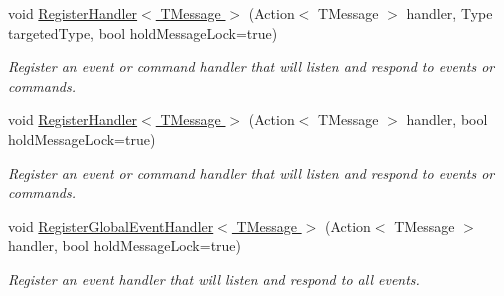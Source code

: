 \begin{DoxyCompactItemize}
void \hyperlink{classCqrs_1_1Akka_1_1Events_1_1AkkaEventBus_a59ec3e497e511b73b5239eee80691443_a59ec3e497e511b73b5239eee80691443}{Register\+Handler$<$ T\+Message $>$} (Action$<$ T\+Message $>$ handler, Type targeted\+Type, bool hold\+Message\+Lock=true)
\begin{DoxyCompactList}\small\item\em Register an event or command handler that will listen and respond to events or commands. \end{DoxyCompactList}\item 
void \hyperlink{classCqrs_1_1Akka_1_1Events_1_1AkkaEventBus_a6795dfcaf611ce1b50310f442cef0546_a6795dfcaf611ce1b50310f442cef0546}{Register\+Handler$<$ T\+Message $>$} (Action$<$ T\+Message $>$ handler, bool hold\+Message\+Lock=true)
\begin{DoxyCompactList}\small\item\em Register an event or command handler that will listen and respond to events or commands. \end{DoxyCompactList}\item 
void \hyperlink{classCqrs_1_1Akka_1_1Events_1_1AkkaEventBus_ab0df68070fbc625cad5cd2e74667b01d_ab0df68070fbc625cad5cd2e74667b01d}{Register\+Global\+Event\+Handler$<$ T\+Message $>$} (Action$<$ T\+Message $>$ handler, bool hold\+Message\+Lock=true)
\begin{DoxyCompactList}\small\item\em Register an event handler that will listen and respond to all events. \end{DoxyCompactList}\end{DoxyCompactItemize}
